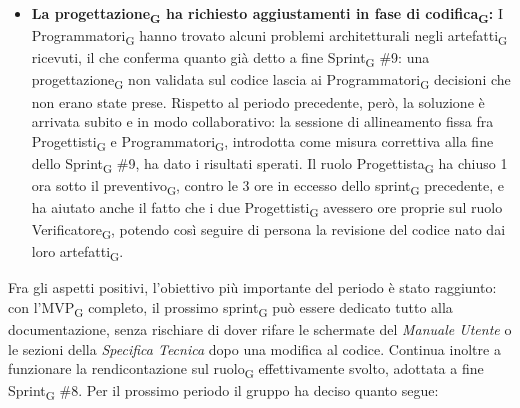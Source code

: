 ﻿\documentclass[a4paper, 10pt, colorlinks=true, linkcolor=black, urlcolor=blue, citecolor=blue, hidelinks]{article}
\begin{document}
\begin{itemize}
    \item \textbf{La progettazione\textsubscript{G} ha richiesto aggiustamenti in fase di codifica\textsubscript{G}:} I Programmatori\textsubscript{G} hanno trovato alcuni problemi architetturali negli artefatti\textsubscript{G} ricevuti, il che conferma quanto già detto a fine Sprint\textsubscript{G} \#9: una progettazione\textsubscript{G} non validata sul codice lascia ai Programmatori\textsubscript{G} decisioni che non erano state prese. Rispetto al periodo precedente, però, la soluzione è arrivata subito e in modo collaborativo: la sessione di allineamento fissa fra Progettisti\textsubscript{G} e Programmatori\textsubscript{G}, introdotta come misura correttiva alla fine dello Sprint\textsubscript{G} \#9, ha dato i risultati sperati. Il ruolo Progettista\textsubscript{G} ha chiuso 1 ora sotto il preventivo\textsubscript{G}, contro le 3 ore in eccesso dello sprint\textsubscript{G} precedente, e ha aiutato anche il fatto che i due Progettisti\textsubscript{G} avessero ore proprie sul ruolo Verificatore\textsubscript{G}, potendo così seguire di persona la revisione del codice nato dai loro artefatti\textsubscript{G}.

\end{itemize}
Fra gli aspetti positivi, l'obiettivo più importante del periodo è stato raggiunto: con l'MVP\textsubscript{G} completo, il prossimo sprint\textsubscript{G} può essere dedicato tutto alla documentazione, senza rischiare di dover rifare le schermate del \textit{Manuale Utente} o le sezioni della \textit{Specifica Tecnica} dopo una modifica al codice. Continua inoltre a funzionare la rendicontazione sul ruolo\textsubscript{G} effettivamente svolto, adottata a fine Sprint\textsubscript{G} \#8.
Per il prossimo periodo il gruppo ha deciso quanto segue:
\end{document}
